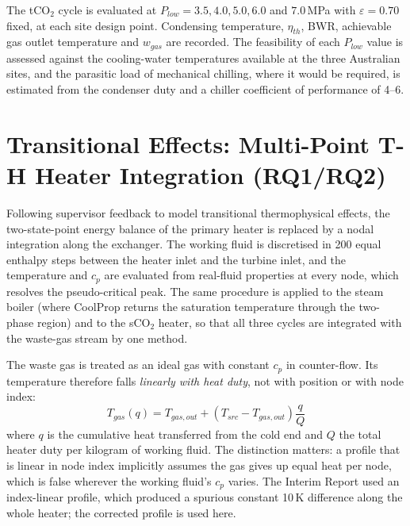 \documentclass[12pt,a4paper]{report}
\begin{document}
The tCO$_2$ cycle is evaluated at $P_{low} = 3.5, 4.0, 5.0, 6.0$ and
$7.0$\,MPa with $\varepsilon = 0.70$ fixed, at each site design point.
Condensing temperature, $\eta_{th}$, BWR, achievable gas outlet temperature
and $w_{gas}$ are recorded. The feasibility of each $P_{low}$ value is assessed
against the cooling-water temperatures available at the three Australian
sites, and the parasitic load of mechanical chilling, where it would be
required, is estimated from the condenser duty and a chiller coefficient of
performance of 4--6.
\section{Transitional Effects: Multi-Point T-H Heater Integration (RQ1/RQ2)}
\label{sec:method_pinch}

Following supervisor feedback to model transitional thermophysical effects,
the two-state-point energy balance of the primary heater is replaced by a
nodal integration along the exchanger. The working fluid is discretised in
200 equal enthalpy steps between the heater inlet and the turbine inlet, and
the temperature and $c_p$ are evaluated from real-fluid properties at every
node, which resolves the pseudo-critical peak. The same procedure is applied
to the steam boiler (where CoolProp returns the saturation temperature
through the two-phase region) and to the sCO$_2$ heater, so that all three
cycles are integrated with the waste-gas stream by one method.

The waste gas is treated as an ideal gas with constant $c_p$ in counter-flow.
Its temperature therefore falls \emph{linearly with heat duty}, not with
position or with node index:
\begin{equation}
T_{gas}(q) = T_{gas,out} + \left(T_{src} - T_{gas,out}\right)\frac{q}{Q}
\label{eq:gas_profile}
\end{equation}
where $q$ is the cumulative heat transferred from the cold end and $Q$ the
total heater duty per kilogram of working fluid. The distinction matters: a
profile that is linear in node index implicitly assumes the gas gives up equal
heat per node, which is false wherever the working fluid's $c_p$ varies. The
Interim Report used an index-linear profile, which produced a spurious
constant 10\,K difference along the whole heater; the corrected profile is
used here.
\end{document}
